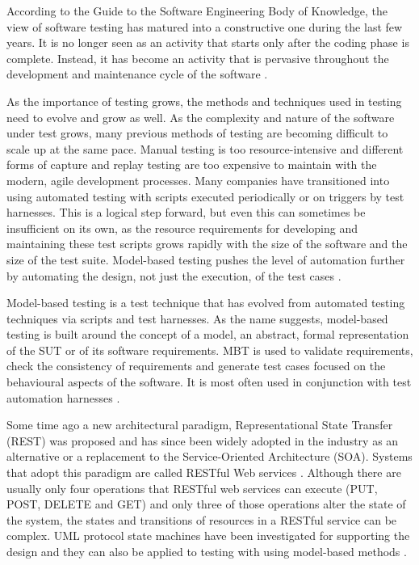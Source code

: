 According to the Guide to the Software Engineering Body of Knowledge, the view of software testing has matured into a constructive one during the last few years. It is no longer seen as an activity that starts only after the coding phase is complete. Instead, it has become an activity that is pervasive throughout the development and maintenance cycle of the software \cite{swebok}. 

As the importance of testing grows, the methods and techniques used in testing need to evolve and grow as well. As the complexity and nature of the software under test grows, many previous methods of testing are becoming difficult to scale up at the same pace. Manual testing is too resource-intensive and different forms of capture and replay testing are too expensive to maintain with the modern, agile development processes. Many companies have transitioned into using automated testing with scripts executed periodically or on triggers by test harnesses. This is a logical step forward, but even this can sometimes be insufficient on its own, as the resource requirements for developing and maintaining these test scripts grows rapidly with the size of the software and the size of the test suite. Model-based testing pushes the level of automation further by automating the design, not just the execution, of the test cases \cite{tools}. 

Model-based testing is a test technique that has evolved from automated testing techniques via scripts and test harnesses. As the name suggests, model-based testing is built around the concept of a model, an abstract, formal representation of the SUT or of its software requirements. MBT is used to validate requirements, check the consistency of requirements and generate test cases focused on the behavioural aspects of the software. It is most often used in conjunction with test automation harnesses \cite{swebok}.

Some time ago a new architectural paradigm, Representational State Transfer (REST) was proposed and has since been widely adopted in the industry as an alternative or a replacement to the Service-Oriented Architecture (SOA). Systems that adopt this paradigm are called RESTful Web services \cite{richardson2008restful}. Although there are usually only four operations that RESTful web services can execute (PUT, POST, DELETE and GET) and only three of those operations alter the state of the system, the states and transitions of resources in a RESTful service can be complex. UML protocol state machines have been investigated for supporting the design and they can also be applied to testing with using model-based methods \cite{Pinheiro2013ModelBasedTO}.
